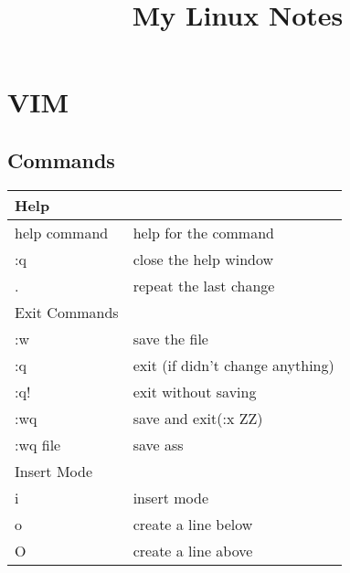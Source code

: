 \documentclass{article}
\begin{document}
	\title{My Linux Notes}
	\maketitle
	\pagebreak
	\tableofcontents
	\pagebreak
	\section{VIM}
		\subsection{Commands}
		\begin{longtable}{ll}
			\hline
			Help                                        &                                                   \\ \hline
			help command                                & help for the command                              \\
			:q                                          & close the help window                             \\
			.                                           & repeat the last change                            \\ \hline
			Exit Commands                               &                                                   \\ \hline
			:w                                          & save the file                                     \\
			:q                                          & exit (if didn't change anything)                  \\
			:q!                                         & exit without saving                               \\
			:wq                                         & save and exit(:x ZZ)                              \\
			:wq file                                    & save ass                                          \\ \hline
			Insert Mode                                 &                                                   \\ \hline
			i                                           & insert mode                                       \\
			o                                           & create a line below                               \\
			O                                           & create a line above                               \\

\end{longtable}
\end{document}
